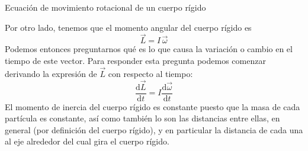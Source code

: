 \documentclass[11pt,handout,aspectratio=1610]{beamer}
\newcommand{\fdiff}[2]{\dfrac{\text{d} #1}{\text{d} #2}}
\begin{document}


\begin{frame}{Ecuación de movimiento rotacional de un cuerpo rígido}

    Por otro lado, tenemos que el momento angular del cuerpo rígido es $$\vec{L} = I \, \vec{\omega}$$ Podemos entonces preguntarnos qué es lo que causa la variación o cambio en el tiempo de este vector. Para responder esta pregunta podemos comenzar derivando la expresión de $\vec{L}$ con respecto al tiempo: $$ \fdiff{\vec{L}}{t} = I \fdiff{\vec{\omega}}{t}$$ El momento de inercia del cuerpo rígido es constante puesto que la masa de cada partícula es constante, así como también lo son las distancias entre ellas, en general (por definición del cuerpo rígido), y en particular la distancia de cada una al eje alrededor del cual gira el cuerpo rígido.

\end{frame}
\end{document}
